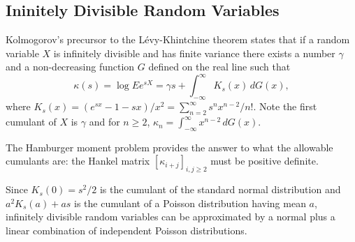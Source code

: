 \documentclass[fleqn]{amsart}
\newcommand{\Var}{\mathop{\rm{Var}}}
\theoremstyle{definition}
\begin{document}
%



\subsection{Ininitely Divisible Random Variables}



Kolmogorov's precursor to the L\'evy-Khintchine theorem\cite{Kol1992}
states that if a random variable \(X\) is infinitely divisible
and has finite variance
there exists a number \(\gamma\) and a non-decreasing function
\(G\) defined on the real line such that
\[
\kappa(s) = \log Ee^{sX} = \gamma s + \int_{-\infty}^\infty K_s(x)\,dG(x),
\]
where \(K_s(x) = (e^{sx} - 1 - sx)/x^2 = \sum_{n=2}^\infty s^nx^{n-2}/n!\).
Note the first cumulant of \(X\) is \(\gamma\) and for \(n\ge 2\),
\(\kappa_n = \int_{-\infty}^\infty x^{n-2}\,dG(x)\).

The Hamburger moment problem\cite{ShoTam1943} provides the answer to
what the allowable cumulants are: the Hankel matrix
\([\kappa_{i+j}]_{i,j\ge 2}\) must be positive definite.

Since \(K_s(0) = s^2/2\) is the cumulant of the standard normal
distribution and \(a^2K_s(a) + as\) is the cumulant of a
Poisson distribution having mean \(a\),
infinitely divisible random variables can be
approximated by a normal plus a linear combination of
independent Poisson distributions.

%
\end{document}
